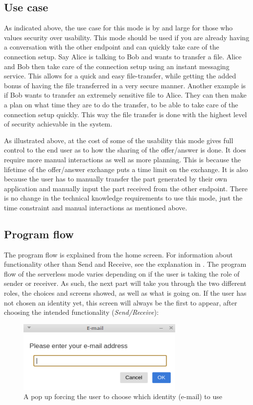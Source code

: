 \subsection{Use case}
%
As indicated above, the use case for this mode is by and large for those who values security over usability. This mode should be used if you are already having a conversation with the other endpoint and can quickly take care of the connection setup. Say Alice is talking to Bob and wants to transfer a file. Alice and Bob then take care of the connection setup using an instant messaging service. This allows for a quick and easy file-transfer, while getting the added bonus of having the file transferred in a very secure manner. Another example is if Bob wants to transfer an extremely sensitive file to Alice. They can then make a plan on what time they are to do the transfer, to be able to take care of the connection setup quickly. This way the file transfer is done with the highest level of security achievable in the system.

As illustrated above, at the cost of some of the usability this mode gives full control to the end user as to how the sharing of the offer/answer is done. It does require more manual interactions as well as more planning. This is because the lifetime of the offer/answer exchange puts a time limit on the exchange. It is also because the user has to manually transfer the part generated by their own application and manually input the part received from the other endpoint. There is no change in the technical knowledge requirements to use this mode, just the time constraint and manual interactions as mentioned above.
%
\subsection{Program flow}
%
The program flow is explained from the home screen. For information about functionality other than Send and Receive, see the explanation in .
The program flow of the serverless mode varies depending on if the user is taking the role of sender or receiver. As such, the next part will take you through the two different roles, the choices and screens showed, as well as what is going on. If the user has not chosen an identity yet, this screen will always be the first to appear, after choosing the intended functionality (\emph{Send/Receive}):
\begin{figure}[H]
  \centering
  \includegraphics[width=\textwidth]{Figures/SL/pop_up_own}
  \decoRule
  \caption[Enter own e-mail address screen]{A pop up forcing the user to choose which identity (e-mail) to use}
  \label{fig:serv_popown}
\end{figure}

